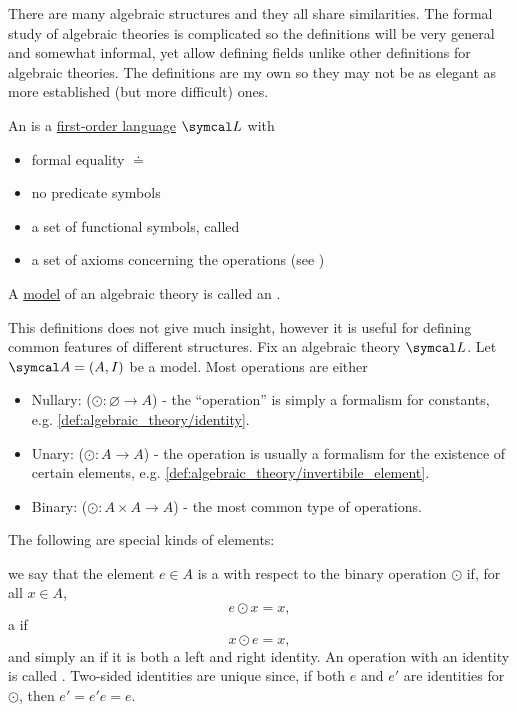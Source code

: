 \begin{definition}\label{def:algebraic_theory}\cite[remark 2.1.4]{Leinster2014}
  There are many algebraic structures and they all share similarities. The formal study of algebraic theories is complicated so the definitions will be very general and somewhat informal, yet allow defining fields unlike other definitions for algebraic theories. The definitions are my own so they may not be as elegant as more established (but more difficult) ones.

  An  is a \hyperref[def:first_order_logic_language]{first-order language} \( \Cal{L} \) with
  \begin{itemize}
    \item formal equality \( \doteq \)
    \item no predicate symbols
    \item a set of functional symbols, called 
    \item a set of axioms concerning the operations (see )
  \end{itemize}

  A \hyperref[def:first_order_model]{model} of an algebraic theory is called an .

  This definitions does not give much insight, however it is useful for defining common features of different structures. Fix an algebraic theory \( \Cal{L} \). Let \( \Cal{A} = (A, I) \) be a model. Most operations are either
  \begin{itemize}
    \item Nullary: (\( \odot: \varnothing \to A \)) - the \enquote{operation} is simply a formalism for constants, e.g. \ref{def:algebraic_theory/identity}.
    \item Unary: (\( \odot: A \to A \)) - the operation is usually a formalism for the existence of certain elements, e.g. \ref{def:algebraic_theory/invertibile_element}.
    \item Binary: (\( \odot: A \times A \to A \)) - the most common type of operations.
  \end{itemize}

  The following are special kinds of elements:
  \begin{defenum}
     we say that the element \( e \in A \) is a  with respect to the binary operation \( \odot \) if, for all \( x \in A \),
    \begin{equation*}
      e \odot x = x,
    \end{equation*}
    a  if
    \begin{equation*}
      x \odot e = x,
    \end{equation*}
    and simply an  if it is both a left and right identity. An operation with an identity is called . Two-sided identities are unique since, if both \( e \) and \( e' \) are identities for \( \odot \), then \( e' = e' e = e \).


\end{defenum}
\end{definition}
